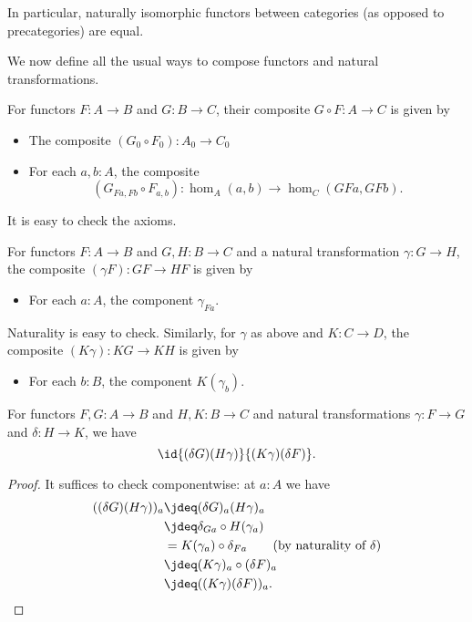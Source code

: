 In particular, naturally isomorphic functors between categories (as opposed to precategories) are equal.

\mentalpause

We now define all the usual ways to compose functors and natural transformations.

\begin{defn}\label{ct:functor-composition}
  For functors $F:A\to B$ and $G:B\to C$, their composite $G\circ F:A\to C$ is given by
  \begin{itemize}
  \item The composite $(G_0\circ F_0) : A_0 \to C_0$
  \item For each $a,b:A$, the composite
    \[(G_{Fa,Fb}\circ F_{a,b}):\hom_A(a,b) \to \hom_C(GFa,GFb).\]
  \end{itemize}
  It is easy to check the axioms.
\end{defn}

\begin{defn}\label{ct:whisker}
  For functors $F:A\to B$ and $G,H:B\to C$ and a natural transformation $\gamma:G\to H$, the composite $(\gamma F):GF\to HF$ is given by
  \begin{itemize}
  \item For each $a:A$, the component $\gamma_{Fa}$.
  \end{itemize}
  Naturality is easy to check.
  Similarly, for $\gamma$ as above and $K:C\to D$, the composite $(K\gamma):KG\to KH$ is given by
  \begin{itemize}
  \item For each $b:B$, the component $K(\gamma_b)$.
  \end{itemize}
\end{defn}

\begin{lem}\label{ct:interchange}
  For functors $F,G:A\to B$ and $H,K:B\to C$ and natural transformations $\gamma:F\to G$ and $\delta:H\to K$, we have
  \[\id{(\delta G)(H\gamma)}{(K\gamma)(\delta F)}.\]
\end{lem}
\begin{proof}
  It suffices to check componentwise: at $a:A$ we have
  \begin{align*}
    ((\delta G)(H\gamma))_a
    &\jdeq (\delta G)_{a}(H\gamma)_a\\
    &\jdeq \delta_{Ga}\circ H(\gamma_a)\\
    &= K(\gamma_a) \circ \delta_{Fa} \tag{by naturality of $\delta$}\\
    &\jdeq (K \gamma)_a\circ (\delta F)_a\\
    &\jdeq ((K \gamma)(\delta F))_a.\qedhere
  \end{align*}
\end{proof}

